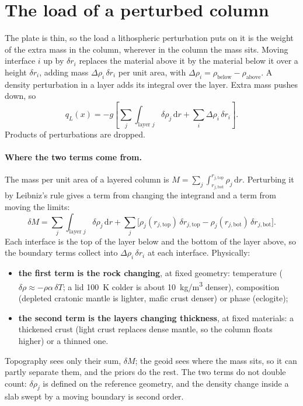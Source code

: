 \section{The load of a perturbed column}

The plate is thin, so the load a lithospheric perturbation puts on it is the weight of the extra mass in the column, wherever in the column the mass sits.
Moving interface $i$ up by $\delta r_i$ replaces the material above it by the material below it over a height $\delta r_i$, adding mass $\Delta\rho_i\,\delta r_i$ per unit area, with $\Delta\rho_i = \rho_{\mathrm{below}} - \rho_{\mathrm{above}}$.
A density perturbation in a layer adds its integral over the layer.
Extra mass pushes down, so
\begin{equation}
    q_L(x) = -g\left[\sum_j \int_{\text{layer } j}\delta\rho_j\,\mathrm{d}r + \sum_i \Delta\rho_i\,\delta r_i\right] .
\end{equation}
Products of perturbations are dropped.

\paragraph{Where the two terms come from.}
The mass per unit area of a layered column is $M = \sum_j \int_{r_{j,\mathrm{bot}}}^{r_{j,\mathrm{top}}} \rho_j\,\mathrm{d}r$.
Perturbing it by Leibniz's rule gives a term from changing the integrand and a term from moving the limits:
\[
    \delta M = \sum_j \int_{\text{layer } j} \delta\rho_j\,\mathrm{d}r
    + \sum_j \Big[\rho_j(r_{j,\mathrm{top}})\,\delta r_{j,\mathrm{top}} - \rho_j(r_{j,\mathrm{bot}})\,\delta r_{j,\mathrm{bot}}\Big].
\]
Each interface is the top of the layer below and the bottom of the layer above, so the boundary terms collect into $\Delta\rho_i\,\delta r_i$ at each interface.
Physically:
\begin{itemize}[nosep]
\item \textbf{the first term is the rock changing}, at fixed geometry: temperature ($\delta\rho\approx-\rho\alpha\,\delta T$; a lid \qty{100}{K} colder is about \qty{10}{kg/m^3} denser), composition (depleted cratonic mantle is lighter, mafic crust denser) or phase (eclogite);
\item \textbf{the second term is the layers changing thickness}, at fixed materials: a thickened crust (light crust replaces dense mantle, so the column floats higher) or a thinned one.
\end{itemize}
Topography sees only their sum, $\delta M$; the geoid sees where the mass sits, so it can partly separate them, and the priors do the rest.
The two terms do not double count: $\delta\rho_j$ is defined on the reference geometry, and the density change inside a slab swept by a moving boundary is second order.

